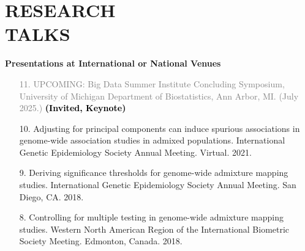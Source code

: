 \documentclass[margin]{res}
\newcommand{\annotate}[1]{\textcolor{black}{\textbf{(#1)}}}
\newcommand{\annotateItem}[1]{
	\begin{itemize} \vspace{-0.1cm}
	\item[] 
	\begin{footnotesize}\textcolor{black}{(#1)}\end{footnotesize}
	\end{itemize} \vspace{-0.1cm}
}
\begin{document}
\begin{resume}
\begin{itemize}
\end{itemize}



\section{RESEARCH \\TALKS}

\textbf{Presentations at International or National Venues}

\begin{itemize}

\item[\textcolor{gray}{11.}] \textcolor{gray}{UPCOMING: 
Big Data Summer Institute Concluding Symposium, University of Michigan Department of Biostatistics, Ann Arbor, MI. (July 2025.) 
\annotate{Invited, Keynote}}
	
\item[10.] Adjusting for principal components can induce spurious associations in genome-wide association studies in admixed populations. 
International Genetic Epidemiology Society Annual Meeting. Virtual. 2021. %
	
\item[9.] Deriving significance thresholds for genome-wide admixture mapping studies. 
International Genetic Epidemiology Society Annual Meeting. San Diego, CA. 2018. 

\item[8.] Controlling for multiple testing in genome-wide admixture mapping studies. 
Western North American Region of the International Biometric Society Meeting. Edmonton, Canada. 2018. %
	

\end{itemize}
\end{resume}
\end{document}

